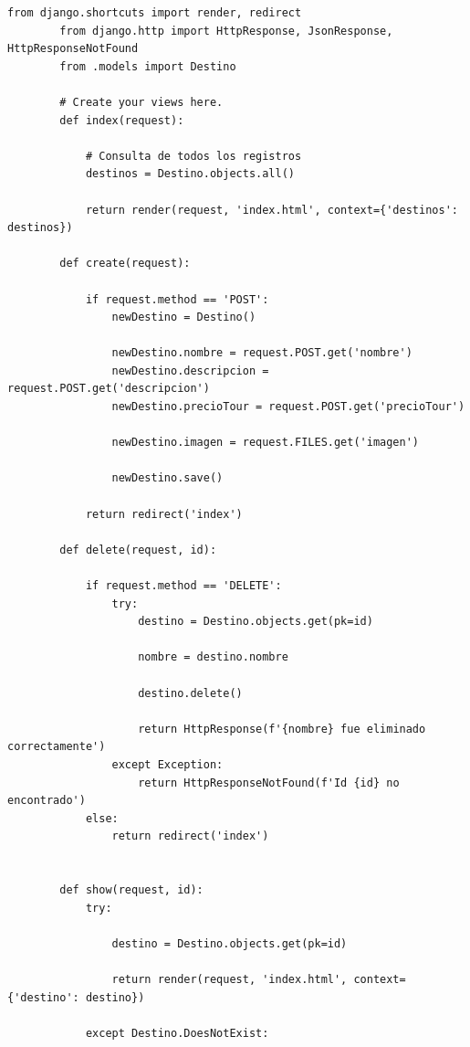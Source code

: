 \documentclass{article}
\begin{document}
        \begin{lstlisting}[caption={Archivo views.py de app}, label={codigo-vistas-controladores}]
        from django.shortcuts import render, redirect
        from django.http import HttpResponse, JsonResponse, HttpResponseNotFound
        from .models import Destino
        
        # Create your views here.
        def index(request):
        
            # Consulta de todos los registros
            destinos = Destino.objects.all()
        
            return render(request, 'index.html', context={'destinos': destinos})
        
        def create(request):
        
            if request.method == 'POST':
                newDestino = Destino()
        
                newDestino.nombre = request.POST.get('nombre')
                newDestino.descripcion = request.POST.get('descripcion')
                newDestino.precioTour = request.POST.get('precioTour')
        
                newDestino.imagen = request.FILES.get('imagen')
        
                newDestino.save()
        
            return redirect('index')
        
        def delete(request, id):
        
            if request.method == 'DELETE':
                try:
                    destino = Destino.objects.get(pk=id)
        
                    nombre = destino.nombre
        
                    destino.delete()
        
                    return HttpResponse(f'{nombre} fue eliminado correctamente')
                except Exception:
                    return HttpResponseNotFound(f'Id {id} no encontrado')
            else:
                return redirect('index')
        
        
        def show(request, id):
            try:
        
                destino = Destino.objects.get(pk=id)
        
                return render(request, 'index.html', context={'destino': destino})
            
            except Destino.DoesNotExist:
        

\end{lstlisting}
\end{document}
